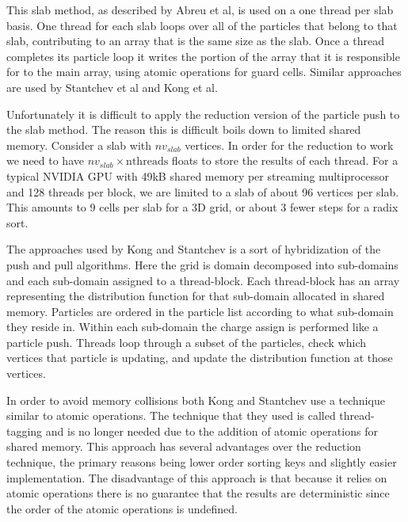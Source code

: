This slab method, as described by Abreu et al, is used on a one thread per slab basis. One thread for each slab loops over all of the particles that belong to that slab, contributing to an array that is the same size as the slab. Once a thread completes its particle loop it writes the portion of the array that it is responsible for to the main array, using atomic operations for guard cells.\cite{Abreu2011} Similar approaches are used by Stantchev et al and Kong et al.\cite{Stantchev2008}\cite{Kong2011}

Unfortunately it is difficult to apply the reduction version of the particle push to the slab method. The reason this is difficult boils down to limited shared memory. Consider a slab with $nv_{slab}$ vertices. In order for the reduction to work we need to have $nv_{slab} \times \mathrm{nthreads}$ floats to store the results of each thread. For a typical NVIDIA GPU with 49kB shared memory per streaming multiprocessor and 128 threads per block, we are limited to a slab of about 96 vertices per slab. This amounts to 9 cells per slab for a 3D grid, or about 3 fewer steps for a radix sort.

The approaches used by Kong and Stantchev is a sort of hybridization of the push and pull algorithms. Here the grid is domain decomposed into sub-domains and each sub-domain assigned to a thread-block. Each thread-block has an array representing the distribution function for that sub-domain allocated in shared memory. Particles are ordered in the particle list according to what sub-domain they reside in. Within each sub-domain the charge assign is performed like a particle push. Threads loop through a subset of the particles, check which vertices that particle is updating, and update the distribution function at those vertices. 

In order to avoid memory collisions both Kong and Stantchev use a technique similar to atomic operations. The technique that they used is called thread-tagging and is no longer needed due to the addition of atomic operations for shared memory.\cite{Stantchev2008}\cite{Kong2011} This approach has several advantages over the reduction technique, the primary reasons being lower order sorting keys and slightly easier implementation. The disadvantage of this approach is that because it relies on atomic operations there is no guarantee that the results are deterministic since the order of the atomic operations is undefined. 







